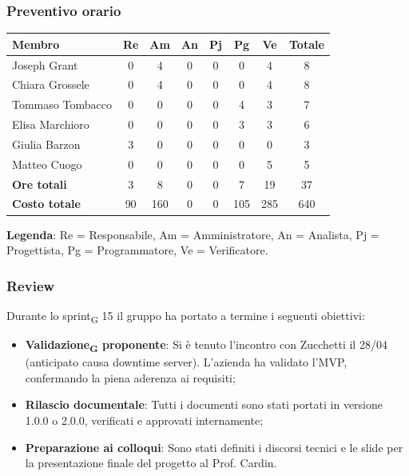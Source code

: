 \documentclass[11pt,a4paper]{article}
\newcommand{\gls}[1]{#1\textsubscript{G}}
\begin{document}
\subsubsection{Preventivo orario}
\begin{center}
    \begin{tabular}{|l|c|c|c|c|c|c|c|}
        \hline
        \textbf{Membro} & \textbf{Re} & \textbf{Am} & \textbf{An} & \textbf{Pj} & \textbf{Pg} & \textbf{Ve} & \textbf{Totale} \\
        \hline
        Joseph Grant & 0 & 4 & 0 & 0 & 0 & 4 & 8 \\
        \hline
        Chiara Grossele & 0 & 4 & 0 & 0 & 0 & 4 & 8 \\
        \hline
        Tommaso Tombacco & 0 & 0 & 0 & 0 & 4 & 3 & 7 \\
        \hline
        Elisa Marchioro & 0 & 0 & 0 & 0 & 3 & 3 & 6 \\
        \hline
        Giulia Barzon & 3 & 0 & 0 & 0 & 0 & 0 & 3 \\
        \hline
        Matteo Cuogo & 0 & 0 & 0 & 0 & 0 & 5 & 5 \\
        \hline
        \textbf{Ore totali} & 3 & 8 & 0 & 0 & 7 & 19 & 37 \\
        \hline
        \textbf{Costo totale} & 90 & 160 & 0 & 0 & 105 & 285 & 640 \\
        \hline
    \end{tabular}
\end{center}

\noindent \textbf{Legenda}: Re = Responsabile, Am = Amministratore, An = Analista, Pj = Progettista, Pg = Programmatore, Ve = Verificatore.


\subsubsection{Review}
Durante lo \gls{sprint} 15 il gruppo ha portato a termine i seguenti obiettivi:
\begin{itemize}
    \item \textbf{\gls{Validazione} proponente}: Si è tenuto l'incontro con Zucchetti il 28/04 (anticipato causa downtime server). L'azienda ha validato l'MVP, confermando la piena aderenza ai requisiti;
    \item \textbf{Rilascio documentale}: Tutti i documenti sono stati portati in versione 1.0.0 o 2.0.0, verificati e approvati internamente;
    \item \textbf{Preparazione ai colloqui}: Sono stati definiti i discorsi tecnici e le slide per la presentazione finale del progetto al Prof. Cardin.
\end{itemize}
\end{document}

